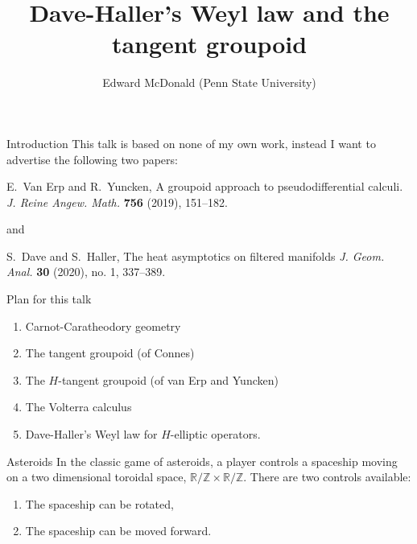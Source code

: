 \documentclass{beamer}
\newcommand\makebeamertitle{\frame{\maketitle}}%
\numberwithin{equation}{section}
\theoremstyle{plain}
\theoremstyle{plain}
\theoremstyle{definition}
\theoremstyle{plain}
\theoremstyle{plain}
\theoremstyle{definition}
\newcommand{\Rl}{\mathbb{R}}
\newcommand{\Itgr}{\mathbb{Z}}
\begin{document}
\title[Weyl law and the tangent groupoid]{Dave-Haller's Weyl law and the tangent groupoid}


\author[E. McDonald]{Edward McDonald (Penn State University)}



\makebeamertitle


\begin{frame}{Introduction}
  This talk is based on none of my own work, instead I want to advertise the following two papers:
  \begin{center}
    E.~Van Erp and R.~Yuncken, A groupoid approach to pseudodifferential calculi. \emph{J. Reine Angew. Math.} \textbf{756} (2019), 151--182.
  \end{center}
  and
  \begin{center}
    S.~Dave and S.~Haller, The heat asymptotics on filtered manifolds \emph{J. Geom. Anal.} \textbf{30} (2020), no. 1, 337--389.
  \end{center}
\end{frame}

\begin{frame}{Plan for this talk}
    \begin{enumerate}
        \item{} Carnot-Caratheodory geometry
        \item{} The tangent groupoid (of Connes)
        \item{} The $H$-tangent groupoid (of van Erp and Yuncken)
        \item{} The Volterra calculus
        \item{} Dave-Haller's Weyl law for $H$-elliptic operators.
    \end{enumerate}
\end{frame}

\begin{frame}{Asteroids}
  In the classic game of asteroids, a player controls a spaceship moving on a two dimensional toroidal space, $\Rl/\Itgr\times \Rl/\Itgr.$ There are two controls available:
  \begin{enumerate}[{\rm (i)}]
    \item{} The spaceship can be rotated,
    \item{} The spaceship can be moved forward.
  \end{enumerate}
\end{frame}
\end{document}
